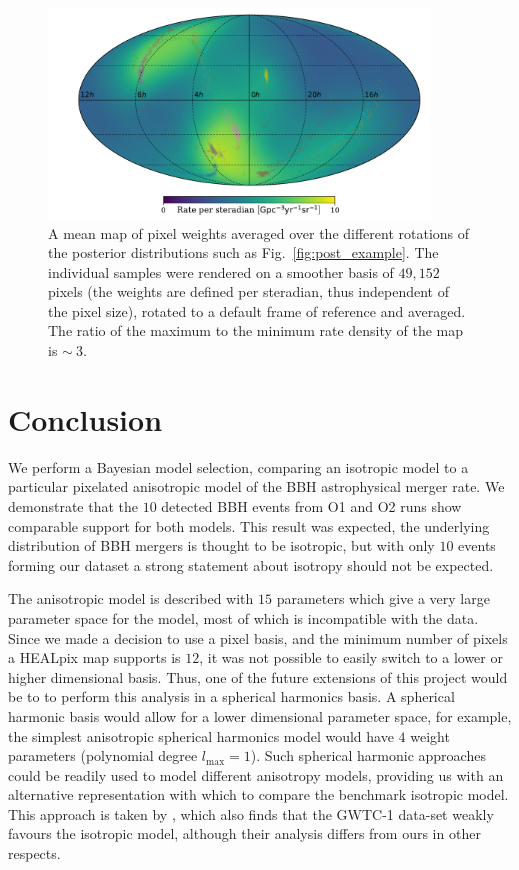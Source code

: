 \documentclass[usenatbib,useAMS]{mnras}
\begin{document}
\begin{figure}
	\centering
    \includegraphics[width=0.90\textwidth]{./figures/aniso_map.pdf}
    \caption{A mean map of pixel weights averaged over the different rotations of the
    posterior distributions such as Fig.~\ref{fig:post_example}. The individual
    samples were rendered on a smoother basis of $49,152$ pixels (the weights are
    defined per steradian, thus independent of the pixel size), rotated to a
    default frame of reference and averaged. The ratio of the maximum to the
    minimum rate density of the map is $\sim~3$.}
	\label{fig:smoothedMap}
\end{figure}

\section{Conclusion}\label{sec:conclusion}
We perform a Bayesian model selection, comparing an isotropic model to a
particular pixelated anisotropic model of the \ac{BBH} astrophysical merger
rate. We demonstrate that the $10$ detected \ac{BBH} events from O1 and O2
runs show comparable support for both models. This result was expected, the
underlying distribution of \ac{BBH} mergers is thought to be isotropic,
but with only $10$ events forming our dataset a strong statement about
isotropy should not be expected.

The anisotropic model is described with $15$ parameters which give a very large
parameter space for the model, most of which is incompatible with the data.
Since we made a decision to use a pixel basis, and the minimum number of pixels a
HEALpix map supports is $12$, it was not possible to easily switch to a lower
or higher dimensional basis. Thus, one of the future extensions of this project would
be to to perform this analysis in a spherical harmonics basis. A spherical
harmonic basis would allow for a lower dimensional parameter space,
for example, the simplest anisotropic spherical harmonics model would have $4$
weight parameters (polynomial degree $l_{\mathrm{max}}=1$). Such spherical
harmonic approaches could be readily used to model different anisotropy models,
providing us with an alternative representation with which to compare the
benchmark isotropic model. This approach is taken by \cite{Payne:2020pmc},
which also finds that the GWTC-1 data-set weakly favours the isotropic model,
although their analysis differs from ours in other respects.
\end{document}
